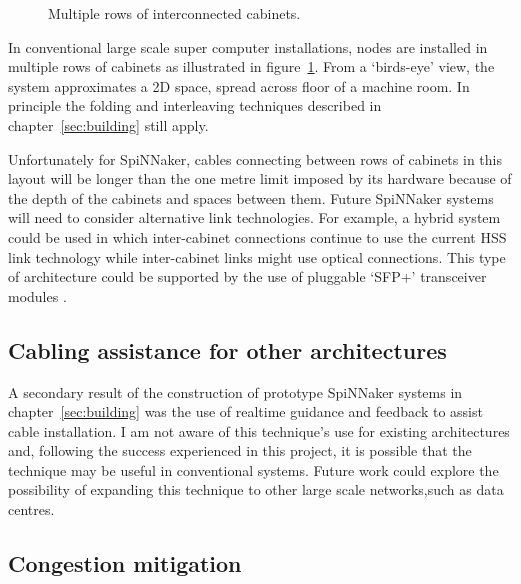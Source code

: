 			\begin{figure}
				\center
				
				\caption{Multiple rows of interconnected cabinets.}
				\label{fig:multi-row-cabling}
			\end{figure}
			
			In conventional large scale super computer installations, nodes are
			installed in multiple rows of cabinets as illustrated in
			figure~\ref{fig:multi-row-cabling}.  From a `birds-eye' view, the system
			approximates a 2D space, spread across floor of a machine room. In
			principle the folding and interleaving techniques described in
			chapter~\ref{sec:building} still apply.
			
			Unfortunately for SpiNNaker, cables connecting between rows of cabinets
			in this layout will be longer than the one metre limit imposed by its
			hardware because of the depth of the cabinets and spaces between them.
			Future SpiNNaker systems will need to consider alternative link
			technologies.  For example, a hybrid system could be used in which
			inter-cabinet connections continue to use the current HSS link technology
			while inter-cabinet links might use optical connections. This type of
			architecture could be supported by the use of pluggable `SFP+'
			transceiver modules \cite{sff01}.
		
		\subsection{Cabling assistance for other architectures}
			
			A secondary result of the construction of prototype SpiNNaker systems in
			chapter~\ref{sec:building} was the use of realtime guidance and feedback
			to assist cable installation. I am not aware of this technique's use for
			existing architectures and, following the success experienced in this
			project, it is possible that the technique may be useful in conventional
			systems. Future work could explore the possibility of expanding this
			technique to other large scale networks,such as data centres.
		
		\subsection{Congestion mitigation}
			
			\label{sec:wiggly-board-allocations}
			
